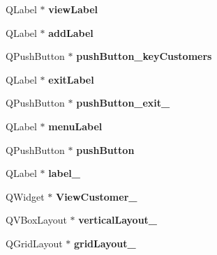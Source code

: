 \begin{DoxyCompactItemize}
\item 
\hypertarget{class_ui___main_window_a4fa313108fb2b2deb5eecc911ea0ea94}{}\label{class_ui___main_window_a4fa313108fb2b2deb5eecc911ea0ea94} 
Q\+Label $\ast$ {\bfseries view\+Label}
\item 
\hypertarget{class_ui___main_window_a664e617f9dba96fb7876c39b9f28da13}{}\label{class_ui___main_window_a664e617f9dba96fb7876c39b9f28da13} 
Q\+Label $\ast$ {\bfseries add\+Label}
\item 
\hypertarget{class_ui___main_window_a8b3749e7c2b016f13823c2979f65a138}{}\label{class_ui___main_window_a8b3749e7c2b016f13823c2979f65a138} 
Q\+Push\+Button $\ast$ {\bfseries push\+Button\+\_\+key\+Customers}
\item 
\hypertarget{class_ui___main_window_a4f84e9996b7c3df489b04a7c2e57bb4d}{}\label{class_ui___main_window_a4f84e9996b7c3df489b04a7c2e57bb4d} 
Q\+Label $\ast$ {\bfseries exit\+Label}
\item 
\hypertarget{class_ui___main_window_a9410746bf57582f0dd720a5f55dedafc}{}\label{class_ui___main_window_a9410746bf57582f0dd720a5f55dedafc} 
Q\+Push\+Button $\ast$ {\bfseries push\+Button\+\_\+exit\+\_}
\item 
\hypertarget{class_ui___main_window_a117e4d61a5a469a44c2016584aa04fc8}{}\label{class_ui___main_window_a117e4d61a5a469a44c2016584aa04fc8} 
Q\+Label $\ast$ {\bfseries menu\+Label}
\item 
\hypertarget{class_ui___main_window_ad332d93084584930878f1daf5f84cdbf}{}\label{class_ui___main_window_ad332d93084584930878f1daf5f84cdbf} 
Q\+Push\+Button $\ast$ {\bfseries push\+Button}
\item 
\hypertarget{class_ui___main_window_a1c16c0a684617927472e534822a63c7d}{}\label{class_ui___main_window_a1c16c0a684617927472e534822a63c7d} 
Q\+Label $\ast$ {\bfseries label\+\_}
\item 
\hypertarget{class_ui___main_window_a7e0fb3338441f84ef9aa31022b757c4d}{}\label{class_ui___main_window_a7e0fb3338441f84ef9aa31022b757c4d} 
Q\+Widget $\ast$ {\bfseries View\+Customer\+\_}
\item 
\hypertarget{class_ui___main_window_a38b8a4b887f3b58e2a49e7905ae6f1f0}{}\label{class_ui___main_window_a38b8a4b887f3b58e2a49e7905ae6f1f0} 
Q\+V\+Box\+Layout $\ast$ {\bfseries vertical\+Layout\+\_}
\item 
\hypertarget{class_ui___main_window_a6b2a0c5f7e8ff2a87134908dd770d2d2}{}\label{class_ui___main_window_a6b2a0c5f7e8ff2a87134908dd770d2d2} 
Q\+Grid\+Layout $\ast$ {\bfseries grid\+Layout\+\_}
\item 

\end{DoxyCompactItemize}
